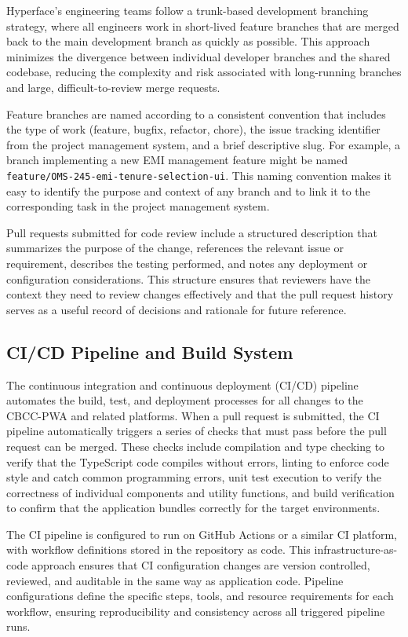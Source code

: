 Hyperface's engineering teams follow a trunk-based development branching strategy, where all engineers work in short-lived feature branches that are merged back to the main development branch as quickly as possible. This approach minimizes the divergence between individual developer branches and the shared codebase, reducing the complexity and risk associated with long-running branches and large, difficult-to-review merge requests.

Feature branches are named according to a consistent convention that includes the type of work (feature, bugfix, refactor, chore), the issue tracking identifier from the project management system, and a brief descriptive slug. For example, a branch implementing a new EMI management feature might be named \texttt{feature/OMS-245-emi-tenure-selection-ui}. This naming convention makes it easy to identify the purpose and context of any branch and to link it to the corresponding task in the project management system.

Pull requests submitted for code review include a structured description that summarizes the purpose of the change, references the relevant issue or requirement, describes the testing performed, and notes any deployment or configuration considerations. This structure ensures that reviewers have the context they need to review changes effectively and that the pull request history serves as a useful record of decisions and rationale for future reference.

\subsection{CI/CD Pipeline and Build System}

The continuous integration and continuous deployment (CI/CD) pipeline automates the build, test, and deployment processes for all changes to the CBCC-PWA and related platforms. When a pull request is submitted, the CI pipeline automatically triggers a series of checks that must pass before the pull request can be merged. These checks include compilation and type checking to verify that the TypeScript code compiles without errors, linting to enforce code style and catch common programming errors, unit test execution to verify the correctness of individual components and utility functions, and build verification to confirm that the application bundles correctly for the target environments.

The CI pipeline is configured to run on GitHub Actions or a similar CI platform, with workflow definitions stored in the repository as code. This infrastructure-as-code approach ensures that CI configuration changes are version controlled, reviewed, and auditable in the same way as application code. Pipeline configurations define the specific steps, tools, and resource requirements for each workflow, ensuring reproducibility and consistency across all triggered pipeline runs.


